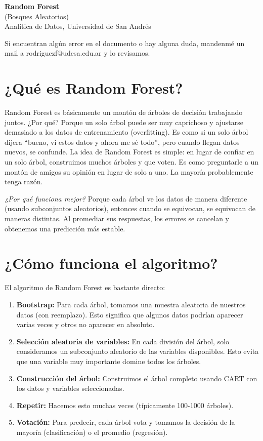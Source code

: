 \documentclass[12pt]{article}
\begin{document}
\begin{center}
  {\LARGE \textbf{Random Forest}}\\[0.5em]
  {\normalsize (Bosques Aleatorios)}\\[0.5em]
  {Analítica de Datos, Universidad de San Andrés}
\end{center}

Si encuentran algún error en el documento o hay alguna duda, mandenmé un mail a rodriguezf@udesa.edu.ar y lo revisamos.

\section{¿Qué es Random Forest?}
Random Forest es básicamente un montón de árboles de decisión trabajando juntos. ¿Por qué? Porque un solo árbol puede ser muy caprichoso y ajustarse demasiado a los datos de entrenamiento (overfitting). Es como si un solo árbol dijera ``bueno, vi estos datos y ahora me sé todo'', pero cuando llegan datos nuevos, se confunde. La idea de Random Forest es simple: en lugar de confiar en un solo árbol, construimos muchos árboles y que voten. Es como preguntarle a un montón de amigos su opinión en lugar de solo a uno. La mayoría probablemente tenga razón.

\vspace{1em}

\textit{¿Por qué funciona mejor?} Porque cada árbol ve los datos de manera diferente (usando subconjuntos aleatorios), entonces cuando se equivocan, se equivocan de maneras distintas. Al promediar sus respuestas, los errores se cancelan y obtenemos una predicción más estable.

\section{¿Cómo funciona el algoritmo?}
El algoritmo de Random Forest es bastante directo:

\begin{enumerate}
    \item \textbf{Bootstrap:} Para cada árbol, tomamos una muestra aleatoria de nuestros datos (con reemplazo). Esto significa que algunos datos podrían aparecer varias veces y otros no aparecer en absoluto.
    \item \textbf{Selección aleatoria de variables:} En cada división del árbol, solo consideramos un subconjunto aleatorio de las variables disponibles. Esto evita que una variable muy importante domine todos los árboles.
    \item \textbf{Construcción del árbol:} Construimos el árbol completo usando CART con los datos y variables seleccionadas.
    \item \textbf{Repetir:} Hacemos esto muchas veces (típicamente 100-1000 árboles).
    \item \textbf{Votación:} Para predecir, cada árbol vota y tomamos la decisión de la mayoría (clasificación) o el promedio (regresión).
\end{enumerate}
\end{document}
